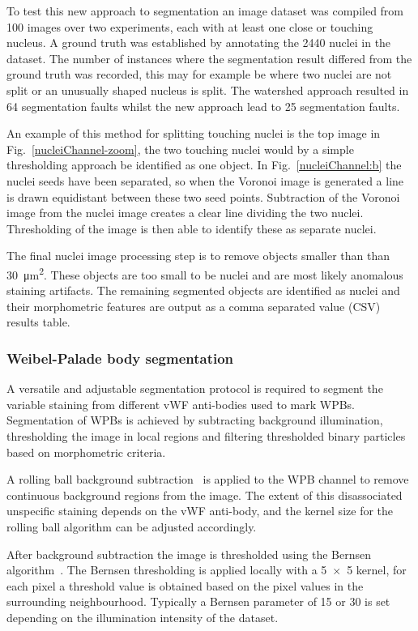 To test this new approach to segmentation an image dataset was compiled from 100 images over two experiments, each with at least one close or touching nucleus. A ground truth was established by annotating the 2440 nuclei in the dataset. The number of instances where the segmentation result differed from the ground truth was recorded, this may for example be where two nuclei are not split or an unusually shaped nucleus is split. The watershed approach resulted in 64 segmentation faults whilst the new approach lead to 25 segmentation faults. 

An example of this method for splitting touching nuclei is the top image in Fig.~\ref{nucleiChannel-zoom}, the two touching nuclei would by a simple thresholding approach be identified as one object. In Fig.~\ref{nucleiChannel:b} the nuclei seeds have been separated, so when the Voronoi image is generated a line is drawn equidistant between these two seed points. Subtraction of the Voronoi image from the nuclei image creates a clear line dividing the two nuclei. Thresholding of the image is then able to identify these as separate nuclei. 

The final nuclei image processing step is to remove objects smaller than than \SI{30}{\micro\meter\squared}. These objects are too small to be nuclei and are most likely anomalous staining artifacts. The remaining segmented objects are identified as nuclei and their morphometric features are output as a comma separated value (CSV) results table. 

\subsubsection{Weibel-Palade body segmentation}
\label{singleCellAnalysis:wpb}
A versatile and adjustable segmentation protocol is required to segment the variable staining from different vWF anti-bodies used to mark WPBs. Segmentation of WPBs is achieved by subtracting background illumination, thresholding the image in local regions and filtering thresholded binary particles based on morphometric criteria. 

A rolling ball background subtraction~\cite{Sternberg1983} is applied to the WPB channel to remove continuous background regions from the image. The extent of this disassociated unspecific staining depends on the vWF anti-body, and the kernel size for the rolling ball algorithm can be adjusted accordingly. 

After background subtraction the image is thresholded using the Bernsen algorithm~\cite{Bernsen1986}. The Bernsen thresholding is applied locally with a 5~$\times$~5 kernel, for each pixel a threshold value is obtained based on the pixel values in the surrounding neighbourhood. Typically a Bernsen parameter of 15 or 30 is set depending on the illumination intensity of the dataset. 

